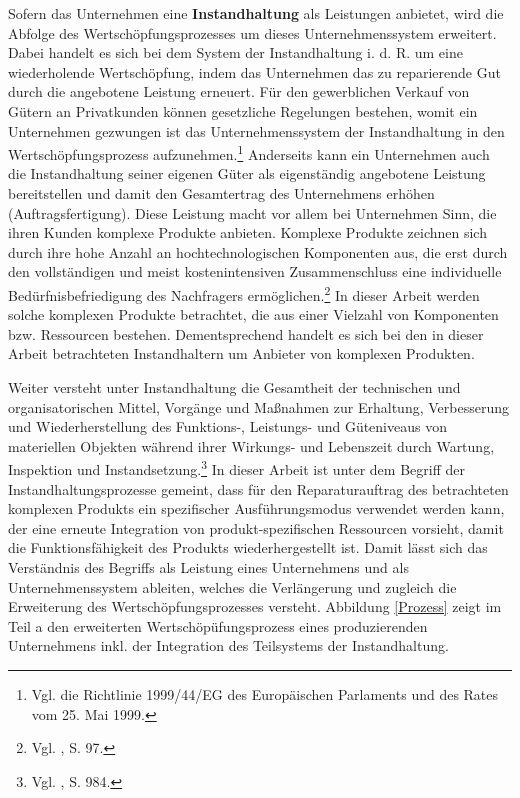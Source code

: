 Sofern das Unternehmen eine \textbf{Instandhaltung} als Leistungen anbietet, wird die Abfolge des Wertschöpfungsprozesses um dieses Unternehmenssystem erweitert. Dabei handelt es sich bei dem System der Instandhaltung i. d. R. um eine wiederholende Wertschöpfung, indem das Unternehmen das zu reparierende Gut durch die angebotene Leistung erneuert. Für den gewerblichen Verkauf von Gütern an Privatkunden können gesetzliche Regelungen bestehen, womit ein Unternehmen gezwungen ist das Unternehmenssystem der Instandhaltung in den Wertschöpfungsprozess aufzunehmen.\footnote{Vgl. die Richtlinie 1999/44/EG des Europäischen Parlaments und des Rates vom 25. Mai 1999.} Anderseits kann ein Unternehmen auch die Instandhaltung seiner eigenen Güter als eigenständig angebotene Leistung bereitstellen und damit den Gesamtertrag des Unternehmens erhöhen (Auftragsfertigung). Diese Leistung macht vor allem bei Unternehmen Sinn, die ihren Kunden komplexe Produkte anbieten. Komplexe Produkte zeichnen sich durch ihre hohe Anzahl an hochtechnologischen Komponenten aus, die erst durch den vollständigen und meist kostenintensiven Zusammenschluss eine individuelle Bedürfnisbefriedigung des Nachfragers ermöglichen.\footnote{Vgl. \cite{komplexe2009Schmidt}, S. 97.} In dieser Arbeit werden solche komplexen Produkte betrachtet, die aus einer Vielzahl von Komponenten bzw. Ressourcen bestehen. Dementsprechend handelt es sich bei den in dieser Arbeit betrachteten Instandhaltern um Anbieter von komplexen Produkten. 

Weiter versteht \citeauthor{helbing2010instandhaltung} unter Instandhaltung die \glqq Gesamtheit der technischen und organisatorischen Mittel, Vorgänge und Maßnahmen zur Erhaltung, Verbesserung und Wiederherstellung des Funktions-, Leistungs- und Güteniveaus von materiellen Objekten während ihrer Wirkungs- und Lebenszeit durch Wartung, Inspektion und Instandsetzung.\grqq\footnote{Vgl. \citeauthor{helbing2010instandhaltung}, S. 984.} In dieser Arbeit ist unter dem Begriff der Instandhaltungsprozesse gemeint, dass für den Reparaturauftrag des betrachteten komplexen Produkts ein spezifischer Ausführungsmodus verwendet werden kann, der eine erneute Integration von produkt-spezifischen Ressourcen vorsieht, damit die Funktionsfähigkeit des Produkts wiederhergestellt ist. Damit lässt sich das Verständnis des Begriffs als Leistung eines Unternehmens und als Unternehmenssystem ableiten, welches die Verlängerung und zugleich die Erweiterung des Wertschöpfungsprozesses versteht. Abbildung \ref{Prozess} zeigt im Teil a den erweiterten Wertschöpüfungsprozess eines produzierenden Unternehmens inkl. der Integration des Teilsystems der Instandhaltung.

